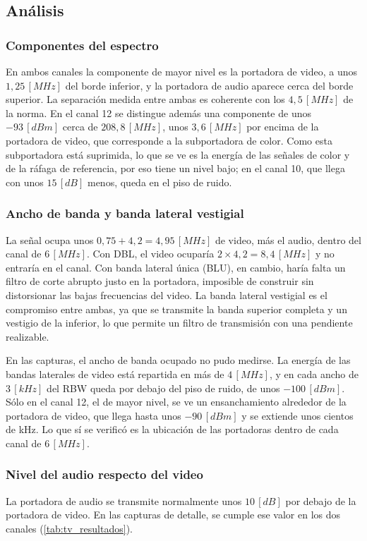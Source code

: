 \subsection{Análisis}

\subsubsection*{Componentes del espectro}
En ambos canales la componente de mayor nivel es la portadora de video, a unos $1{,}25 \, [MHz]$ del borde inferior, y la portadora de audio aparece cerca del borde superior. La separación medida entre ambas es coherente con los $4{,}5 \, [MHz]$ de la norma. En el canal 12 se distingue además una componente de unos $-93 \, [dBm]$ cerca de $208{,}8 \, [MHz]$, unos $3{,}6 \, [MHz]$ por encima de la portadora de video, que corresponde a la subportadora de color. Como esta subportadora está suprimida, lo que se ve es la energía de las señales de color y de la ráfaga de referencia, por eso tiene un nivel bajo; en el canal 10, que llega con unos $15 \, [dB]$ menos, queda en el piso de ruido.

\subsubsection*{Ancho de banda y banda lateral vestigial}
La señal ocupa unos $0{,}75 + 4{,}2 = 4{,}95 \, [MHz]$ de video, más el audio, dentro del canal de $6 \, [MHz]$. Con DBL, el video ocuparía $2 \times 4{,}2 = 8{,}4 \, [MHz]$ y no entraría en el canal. Con banda lateral única (BLU), en cambio, haría falta un filtro de corte abrupto justo en la portadora, imposible de construir sin distorsionar las bajas frecuencias del video. La banda lateral vestigial es el compromiso entre ambas, ya que se transmite la banda superior completa y un vestigio de la inferior, lo que permite un filtro de transmisión con una pendiente realizable.

En las capturas, el ancho de banda ocupado no pudo medirse. La energía de las bandas laterales de video está repartida en más de $4 \, [MHz]$, y en cada ancho de $3 \, [kHz]$ del RBW queda por debajo del piso de ruido, de unos $-100 \, [dBm]$. Sólo en el canal 12, el de mayor nivel, se ve un ensanchamiento alrededor de la portadora de video, que llega hasta unos $-90 \, [dBm]$ y se extiende unos cientos de kHz. Lo que sí se verificó es la ubicación de las portadoras dentro de cada canal de $6 \, [MHz]$.

\subsubsection*{Nivel del audio respecto del video}
La portadora de audio se transmite normalmente unos $10 \, [dB]$ por debajo de la portadora de video. En las capturas de detalle, se cumple ese valor en los dos canales (\autoref{tab:tv_resultados}).


